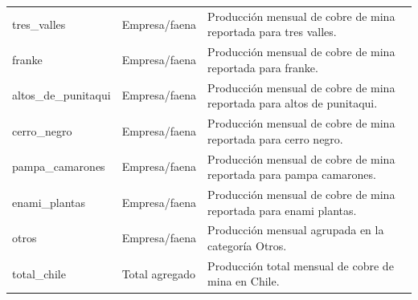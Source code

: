 \begin{longtable}{p{}p{}p{}}
tres\_valles & Empresa/faena & Producción mensual de cobre de mina reportada para tres valles. \\
franke & Empresa/faena & Producción mensual de cobre de mina reportada para franke. \\
altos\_de\_punitaqui & Empresa/faena & Producción mensual de cobre de mina reportada para altos de punitaqui. \\
cerro\_negro & Empresa/faena & Producción mensual de cobre de mina reportada para cerro negro. \\
pampa\_camarones & Empresa/faena & Producción mensual de cobre de mina reportada para pampa camarones. \\
enami\_plantas & Empresa/faena & Producción mensual de cobre de mina reportada para enami plantas. \\
otros & Empresa/faena & Producción mensual agrupada en la categoría Otros. \\
total\_chile & Total agregado & Producción total mensual de cobre de mina en Chile. \\
\bottomrule
\end{longtable}
